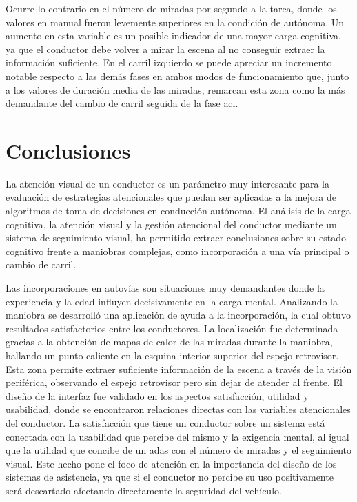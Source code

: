 Ocurre lo contrario en el número de miradas por segundo a la tarea, donde los valores en manual fueron levemente superiores en la condición de autónoma. Un aumento en esta variable es un posible indicador de una mayor carga cognitiva, ya que el conductor debe volver a mirar la escena al no conseguir extraer la información suficiente. En el carril izquierdo se puede apreciar un incremento notable respecto a las demás fases en ambos modos de funcionamiento que, junto a los valores de duración media de las miradas, remarcan esta zona como la más demandante del cambio de carril seguida de la fase \gls{aci}.

\section{Conclusiones}\label{33}

La atención visual de un conductor es un parámetro muy interesante para la evaluación de estrategias atencionales que puedan ser aplicadas a la mejora de algoritmos de toma de decisiones en conducción autónoma. El análisis de la carga cognitiva, la atención visual y la gestión atencional del conductor mediante un sistema de seguimiento visual, ha permitido extraer conclusiones sobre su estado cognitivo frente a maniobras complejas, como incorporación a una vía principal o cambio de carril. 

Las incorporaciones en autovías son situaciones muy demandantes donde la experiencia y la edad influyen decisivamente en la carga mental. Analizando la maniobra se desarrolló una aplicación de ayuda a la incorporación, la cual obtuvo resultados satisfactorios entre los conductores. La localización fue determinada gracias a la obtención de mapas de calor de las miradas durante la maniobra, hallando un punto caliente en la esquina interior-superior del espejo retrovisor. Esta zona permite extraer suficiente información de la escena a través de la visión periférica, observando el espejo retrovisor pero sin dejar de atender al frente. El diseño de la interfaz fue validado en los aspectos satisfacción, utilidad y usabilidad, donde se encontraron relaciones directas con las variables atencionales del conductor. La satisfacción que tiene un conductor sobre un sistema está conectada con la usabilidad que percibe del mismo y la exigencia mental, al igual que la utilidad que concibe de un \gls{adas} con el número de miradas y el seguimiento visual. Este hecho pone el foco de atención en la importancia del diseño de los sistemas de asistencia, ya que si el conductor no percibe su uso positivamente será descartado afectando directamente la seguridad del vehículo. 

